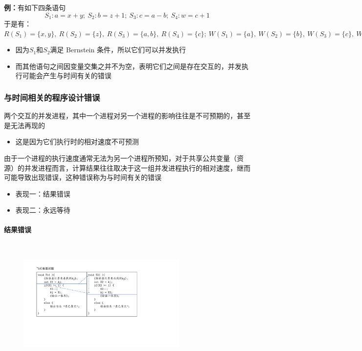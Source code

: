 \documentclass[cs4size,a4paper,10pt]{ctexart}
\begin{document}
	\textbf{例：}有如下四条语句
	$$S_1:a=x+y; \ S_2:b=z+1;\ S_3:c=a-b;\ S_4:w=c+1$$
	于是有：$R(S_1)=\{x,y\},\ R(S_2)=\{z\},\ R(S_3)=\{a,b\},\ R(S_4)=\{c\};\ W(S_1)=\{a\},\ W(S_2)=\{b\},\ W(S_3)=\{c\},\ W(S_4)=\{w\}$
	\begin{itemize}
		\item 因为$S_1$和$S_2$满足 Bernstein 条件，所以它们可以并发执行
		\item 而其他语句之间因变量交集之并不为空，表明它们之间是存在交互的，并发执行可能会产生与时间有关的错误
	\end{itemize}

	\subsubsection{与时间相关的程序设计错误}
	两个交互的并发进程，其中一个进程对另一个进程的影响往往是不可预期的，甚至是无法再现的
	\begin{itemize}
		\item 这是因为它们执行时的相对速度不可预测
	\end{itemize}
	
	由于一个进程的执行速度通常无法为另一个进程所预知，对于共享公共变量（资源）的并发进程而言，计算结果往往取决于这一组并发进程执行的相对速度，继而可能导致出现错误，这种错误称为与时间有关的错误
	\begin{itemize}
		\item 表现一：结果错误
		\item 表现二：永远等待
	\end{itemize}

	\paragraph{结果错误}~{}


	\begin{figure}[H]
		\centering
		\includegraphics[width=0.75\textwidth]{img/飞机售票问题.pdf}
	\end{figure}
\end{document}

